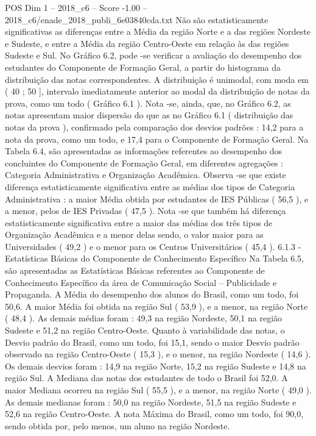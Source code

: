 \begin{textsample}{POS Dim 1 – 2018\_c6 – Score -1.00 – 2018\_c6/enade\_2018\_publi\_6e03840cda.txt}
Não são estatisticamente significativas as diferenças entre a Média da região Norte e a das regiões Nordeste e Sudeste, e entre a Média da região Centro-Oeste em relação às das regiões Sudeste e Sul.
No Gráfico 6.2, pode -se verificar a avaliação do desempenho dos estudantes do Componente de Formação Geral, a partir do histograma da distribuição das notas correspondentes.
A distribuição é unimodal, com moda em ( 40 ; 50 ], intervalo imediatamente anterior ao modal da distribuição de notas da prova, como um todo ( Gráfico 6.1 ).
Nota -se, ainda, que, no Gráfico 6.2, as notas apresentam maior dispersão do que as no Gráfico 6.1 ( distribuição das notas da prova ), confirmado pela comparação dos desvios padrões : 14,2 para a nota da prova, como um todo, e 17,4 para o Componente de Formação Geral.
Na Tabela 6.4, são apresentadas as informações referentes ao desempenho dos concluintes do Componente de Formação Geral, em diferentes agregações : Categoria Administrativa e Organização Acadêmica.
Observa -se que existe diferença estatisticamente significativa entre as médias dos tipos de Categoria Administrativa : a maior Média obtida por estudantes de IES Públicas ( 56,5 ), e a menor, pelos de IES Privadas ( 47,5 ).
Nota -se que também há diferença estatisticamente significativa entre a maior das médias dos três tipos de Organização Acadêmica e a menor delas sendo, o valor maior para as Universidades ( 49,2 ) e o menor para os Centros Universitários ( 45,4 ). 6.1.3 - Estatísticas Básicas do Componente de Conhecimento Específico Na Tabela 6.5, são apresentadas as Estatísticas Básicas referentes ao Componente de Conhecimento Específico da área de Comunicação Social – Publicidade e Propaganda.
A Média do desempenho dos alunos do Brasil, como um todo, foi 50,6.
A maior Média foi obtida na região Sul ( 53,9 ), e a menor, na região Norte ( 48,4 ).
As demais médias foram : 49,3 na região Nordeste, 50,1 na região Sudeste e 51,2 na região Centro-Oeste.
Quanto à variabilidade das notas, o Desvio padrão do Brasil, como um todo, foi 15,1, sendo o maior Desvio padrão observado na região Centro-Oeste ( 15,3 ), e o menor, na região Nordeste ( 14,6 ).
Os demais desvios foram : 14,9 na região Norte, 15,2 na região Sudeste e 14,8 na região Sul.
A Mediana das notas dos estudantes de todo o Brasil foi 52,0.
A maior Mediana ocorreu na região Sul ( 55,5 ), e a menor, na região Norte ( 49,0 ).
As demais medianas foram : 50,0 na região Nordeste, 51,5 na região Sudeste e 52,6 na região Centro-Oeste.
A nota Máxima do Brasil, como um todo, foi 90,0, sendo obtida por, pelo menos, um aluno na região Nordeste.

\end{textsample}
